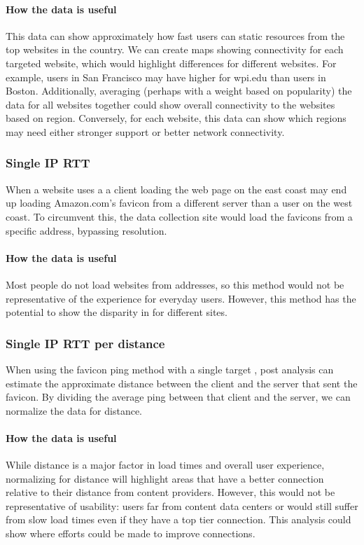 \paragraph{How the data is useful}
This data can show approximately how fast users can static resources from the top websites in the country. We can create maps showing connectivity for each targeted website, which would highlight differences for different websites. For example, users in San Francisco may have higher \rtts for wpi.edu than users in Boston. Additionally, averaging (perhaps with a weight based on popularity) the data for all websites together could show overall connectivity to the websites based on region. Conversely, for each website, this data can show which regions may need either stronger \cdn support or better network connectivity.

\subsubsection{Single IP RTT}
When a website uses a \cdn a client loading the web page on the east coast may end up loading Amazon.com's favicon from a different server than a user on the west coast. To circumvent this, the data collection site would load the favicons from a specific \ip address, bypassing \dns resolution.

\paragraph{How the data is useful}
Most people do not load websites from \ip addresses, so this method would not be representative of the experience for everyday users. However, this method has the potential to show the disparity in \cdns for different sites.

\subsubsection{Single IP RTT per distance}
When using the favicon ping method with a single target \ip, post analysis can estimate the approximate distance between the client and the server that sent the favicon. By dividing the average ping between that client and the server, we can normalize the data for distance.

\paragraph{How the data is useful}
While distance is a major factor in load times and overall user experience, normalizing for distance will highlight areas that have a better connection relative to their distance from content providers. However, this would not be representative of usability: users far from content data centers or \cdns would still suffer from slow load times even if they have a top tier connection. This analysis could show where efforts could be made to improve connections.

